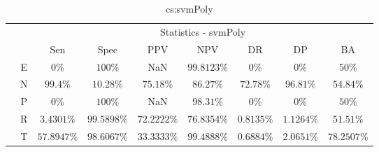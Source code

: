 \begin{table}[!ht]
	\centering
	\begin{tabular}{|c|c|c|c|c|c|c|c|c|}
		\cline{3-9}
		\multicolumn{2}{c|}{} & \multicolumn{7}{c|}{Statistics - svmPoly} \\ \cline{3-9}
		\multicolumn{2}{c|}{} & Sen & Spec & PPV & NPV & DR & DP & BA \\ \hline
		\multirow{5}{*}{\rotatebox{90}{Class}} & E & $0\%$ & $100\%$ & NaN & $99.8123\%$ & $0\%$ & $0\%$ & $50\%$ \\ \cline{2-9}
		 & N & $99.4\%$ & $10.28\%$ & $75.18\%$ & $86.27\%$ & $72.78\%$ & $96.81\%$ & $54.84\%$ \\ \cline{2-9}
		 & P & $0\%$ & $100\%$ & NaN & $98.31\%$ & $0\%$ & $0\%$ & $50\%$ \\ \cline{2-9}
		 & R & $3.4301\%$ & $99.5898\%$ & $72.2222\%$ & $76.8354\%$ & $0.8135\%$ & $1.1264\%$ & $51.51\%$ \\ \cline{2-9}
		 & T & $57.8947\%$ & $98.6067\%$ & $33.3333\%$ & $99.4888\%$ & $0.6884\%$ & $2.0651\%$ & $78.2507\%$ \\ \hline
	\end{tabular}
	\caption{cs:svmPoly}
	\label{tab:cs:svmPoly}
\end{table}
